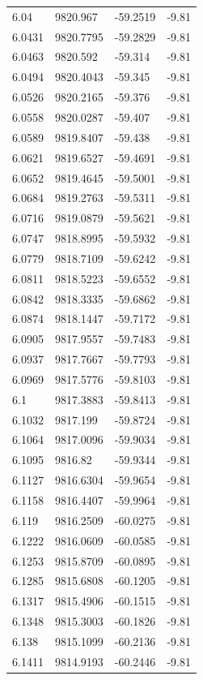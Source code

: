 \begin{table}[H]
\begin{tabular}{llll}
6.04 & 9820.967 & -59.2519 & -9.81 \\
6.0431 & 9820.7795 & -59.2829 & -9.81 \\
6.0463 & 9820.592 & -59.314 & -9.81 \\
6.0494 & 9820.4043 & -59.345 & -9.81 \\
6.0526 & 9820.2165 & -59.376 & -9.81 \\
6.0558 & 9820.0287 & -59.407 & -9.81 \\
6.0589 & 9819.8407 & -59.438 & -9.81 \\
6.0621 & 9819.6527 & -59.4691 & -9.81 \\
6.0652 & 9819.4645 & -59.5001 & -9.81 \\
6.0684 & 9819.2763 & -59.5311 & -9.81 \\
6.0716 & 9819.0879 & -59.5621 & -9.81 \\
6.0747 & 9818.8995 & -59.5932 & -9.81 \\
6.0779 & 9818.7109 & -59.6242 & -9.81 \\
6.0811 & 9818.5223 & -59.6552 & -9.81 \\
6.0842 & 9818.3335 & -59.6862 & -9.81 \\
6.0874 & 9818.1447 & -59.7172 & -9.81 \\
6.0905 & 9817.9557 & -59.7483 & -9.81 \\
6.0937 & 9817.7667 & -59.7793 & -9.81 \\
6.0969 & 9817.5776 & -59.8103 & -9.81 \\
6.1 & 9817.3883 & -59.8413 & -9.81 \\
6.1032 & 9817.199 & -59.8724 & -9.81 \\
6.1064 & 9817.0096 & -59.9034 & -9.81 \\
6.1095 & 9816.82 & -59.9344 & -9.81 \\
6.1127 & 9816.6304 & -59.9654 & -9.81 \\
6.1158 & 9816.4407 & -59.9964 & -9.81 \\
6.119 & 9816.2509 & -60.0275 & -9.81 \\
6.1222 & 9816.0609 & -60.0585 & -9.81 \\
6.1253 & 9815.8709 & -60.0895 & -9.81 \\
6.1285 & 9815.6808 & -60.1205 & -9.81 \\
6.1317 & 9815.4906 & -60.1515 & -9.81 \\
6.1348 & 9815.3003 & -60.1826 & -9.81 \\
6.138 & 9815.1099 & -60.2136 & -9.81 \\
6.1411 & 9814.9193 & -60.2446 & -9.81 \\

\end{tabular}
\end{table}
